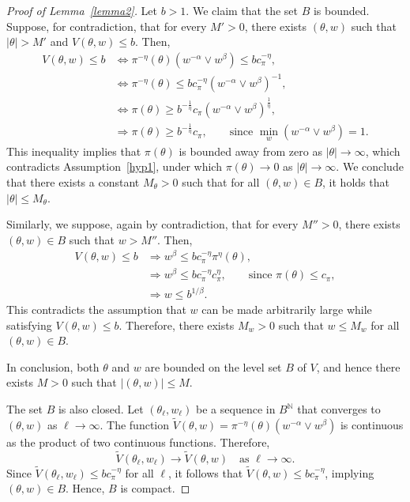 \documentclass[pdflatex,sn-mathphys-num]{sn-jnl}
\newcommand{\nats}{\mathbb{N}}
\renewcommand{\geq}{\geqslant}
\renewcommand{\leq}{\leqslant}
\theoremstyle{thmstyleone}
\theoremstyle{thmstyletwo}
\theoremstyle{thmstylethree}
\begin{document}
\begin{proof}[Proof of Lemma~\ref{lemma2}]
Let \( b > 1 \). We claim that the set \( B \) is bounded. Suppose, for contradiction, that for every \( M' > 0 \), there exists \( (\theta, w) \) such that \( |\theta| > M' \) and \( V(\theta, w) \leq b \). Then,
\begin{align*}
    V(\theta, w) \leq b
    &\Longleftrightarrow
    \pi^{-\eta}(\theta) (w^{-\alpha} \vee w^{\beta}) \leq b c_\pi^{-\eta}, \\
    &\Longleftrightarrow
    \pi^{-\eta}(\theta) \leq b c_\pi^{-\eta} (w^{-\alpha} \vee w^{\beta})^{-1}, \\
    &\Longleftrightarrow
    \pi(\theta) \geq b^{-\frac{1}{\eta}} c_\pi \left( w^{-\alpha} \vee w^{\beta} \right)^{\frac{1}{\eta}}, \\
    &\Longrightarrow
    \pi(\theta) \geq b^{-\frac{1}{\eta}} c_\pi, \qquad \text{since } \min_w \left( w^{-\alpha} \vee w^{\beta} \right) = 1.
\end{align*}
This inequality implies that \( \pi(\theta) \) is bounded away from zero as \( |\theta| \to \infty \), which contradicts Assumption~\ref{hyp1}, under which \( \pi(\theta) \to 0 \) as \( |\theta| \to \infty \). We conclude that there exists a constant \( M_\theta > 0 \) such that for all \( (\theta, w) \in B \), it holds that \( |\theta| \leq M_\theta \).

Similarly, we suppose, again by contradiction, that for every \( M'' > 0 \), there exists \( (\theta, w) \in B \) such that \( w > M'' \). Then,
\begin{align*}
    V(\theta, w) \leq b
    &\Longrightarrow
    w^{\beta} \leq b c_\pi^{-\eta} \pi^{\eta}(\theta), \\
    &\Longrightarrow
    w^{\beta} \leq b c_\pi^{-\eta} c_\pi^{\eta}, \qquad \text{since } \pi(\theta) \leq c_\pi, \\
    &\Longrightarrow
    w \leq b^{1/\beta}.
\end{align*}
This contradicts the assumption that \( w \) can be made arbitrarily large while satisfying \( V(\theta, w) \leq b \). Therefore, there exists \( M_w > 0 \) such that \( w \leq M_w \) for all \( (\theta, w) \in B \).

In conclusion, both \( \theta \) and \( w \) are bounded on the level set \( B \) of $V$, and hence there exists \( M > 0 \) such that \( |(\theta, w)| \leq M \).

The set $B$ is also closed. Let $(\theta_\ell, w_\ell)$ be a sequence in $B^\nats$ that converges to $(\theta, w)$ as $\ell \to \infty$. The function $\tilde{V}(\theta,w) = \pi^{-\eta}(\theta) (w^{-\alpha} \vee w^{\beta})$ is continuous as the product of two continuous functions. Therefore,
\[
\tilde{V}(\theta_\ell, w_\ell) \to \tilde{V}(\theta, w) \quad \text{as } \ell \to \infty.
\]
Since $\tilde{V}(\theta_\ell, w_\ell) \leq b c_\pi^{-\eta}$ for all $\ell$, it follows that $\tilde{V}(\theta, w) \leq b c_\pi^{-\eta}$, implying $(\theta, w) \in B$. Hence, $B$ is compact.


\end{proof}
\end{document}
